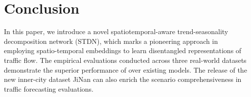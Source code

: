 \section{Conclusion}


In this paper, we introduce a novel spatiotemporal-aware trend-seasonality decomposition network (STDN), which marks a pioneering approach in employing spatio-temporal embeddings to learn disentangled representations of traffic flow. The empirical evaluations conducted across three real-world datasets demonstrate the superior performance of \model over existing models. The release of the new inner-city dataset JiNan can also enrich the scenario comprehensiveness in traffic forecasting evaluations. 


